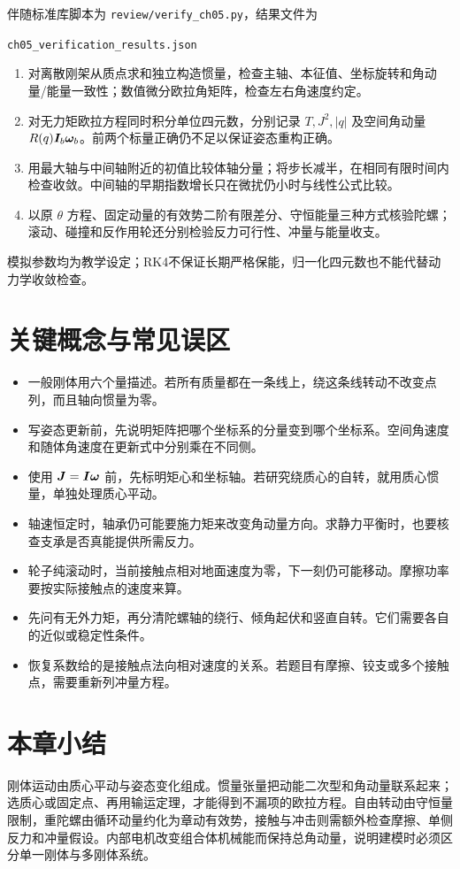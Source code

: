 伴随标准库脚本为 \texttt{review/verify\_ch05.py}，结果文件为
\begin{center}\texttt{ch05\_verification\_results.json}\end{center}
\begin{enumerate}[leftmargin=1.8em]
\item 对离散刚架从质点求和独立构造惯量，检查主轴、本征值、坐标旋转和角动量/能量一致性；数值微分欧拉角矩阵，检查左右角速度约定。
\item 对无力矩欧拉方程同时积分单位四元数，分别记录 $T,J^2,|q|$ 及空间角动量 $R(q)\boldsymbol{I}_b\boldsymbol{\omega}_b$。前两个标量正确仍不足以保证姿态重构正确。
\item 用最大轴与中间轴附近的初值比较体轴分量；将步长减半，在相同有限时间内检查收敛。中间轴的早期指数增长只在微扰仍小时与线性公式比较。
\item 以原 $\theta$ 方程、固定动量的有效势二阶有限差分、守恒能量三种方式核验陀螺；滚动、碰撞和反作用轮还分别检验反力可行性、冲量与能量收支。
\end{enumerate}
模拟参数均为教学设定；RK4不保证长期严格保能，归一化四元数也不能代替动力学收敛检查。

\section*{关键概念与常见误区}
\begin{itemize}[leftmargin=1.8em]
\item 一般刚体用六个量描述。若所有质量都在一条线上，绕这条线转动不改变点列，而且轴向惯量为零。
\item 写姿态更新前，先说明矩阵把哪个坐标系的分量变到哪个坐标系。空间角速度和随体角速度在更新式中分别乘在不同侧。
\item 使用 $\boldsymbol{J}=\boldsymbol{I}\boldsymbol{\omega}$ 前，先标明矩心和坐标轴。若研究绕质心的自转，就用质心惯量，单独处理质心平动。
\item 轴速恒定时，轴承仍可能要施力矩来改变角动量方向。求静力平衡时，也要核查支承是否真能提供所需反力。
\item 轮子纯滚动时，当前接触点相对地面速度为零，下一刻仍可能移动。摩擦功率要按实际接触点的速度来算。
\item 先问有无外力矩，再分清陀螺轴的绕行、倾角起伏和竖直自转。它们需要各自的近似或稳定性条件。
\item 恢复系数给的是接触点法向相对速度的关系。若题目有摩擦、铰支或多个接触点，需要重新列冲量方程。
\end{itemize}

\section*{本章小结}
刚体运动由质心平动与姿态变化组成。惯量张量把动能二次型和角动量联系起来；选质心或固定点、再用输运定理，才能得到不漏项的欧拉方程。自由转动由守恒量限制，重陀螺由循环动量约化为章动有效势，接触与冲击则需额外检查摩擦、单侧反力和冲量假设。内部电机改变组合体机械能而保持总角动量，说明建模时必须区分单一刚体与多刚体系统。

